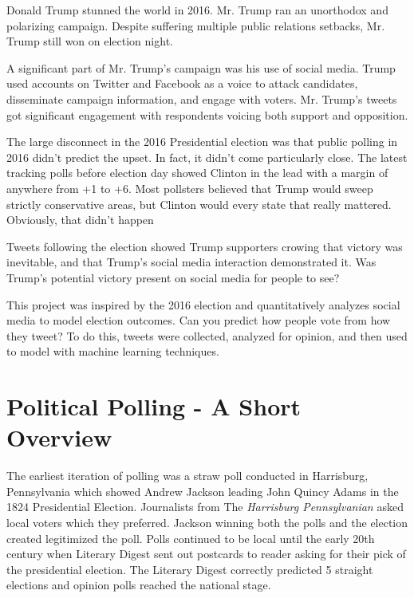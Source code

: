 \documentclass[11pt, twoside, reqno]{book}
\begin{document}
\startmain

\intro
\hspace{0.2in}Donald Trump stunned the world in 2016. Mr. Trump ran an unorthodox and polarizing campaign. Despite suffering multiple public relations setbacks, Mr. Trump still won on election night.

A significant part of Mr. Trump's campaign was his use of social media. Trump used accounts on Twitter and Facebook as a voice to attack candidates, disseminate campaign information, and engage with voters. Mr. Trump's tweets got significant engagement with respondents voicing both support and opposition. 

The large disconnect in the 2016 Presidential election was that public polling in 2016 didn’t predict the upset. In fact, it didn’t come particularly close. The latest tracking polls before election day showed Clinton in the lead with a margin of anywhere from +1 to +6\cite{gallup}. Most pollsters believed that Trump would sweep strictly conservative areas, but Clinton would every state that really mattered. Obviously, that didn’t happen

Tweets following the election showed Trump supporters crowing that victory was inevitable, and that Trump’s social media interaction demonstrated it. Was Trump’s potential victory present on social media for people to see? 

This project was inspired by the 2016 election and quantitatively analyzes social media to model election outcomes. Can you predict how people vote from how they tweet? To do this, tweets were collected, analyzed for opinion, and then used to model with machine learning techniques. 

\section{Political Polling - A Short Overview}
\hspace{0.2in} The earliest iteration of polling was a straw poll conducted in Harrisburg, Pennsylvania which showed Andrew Jackson leading John Quincy Adams in the 1824 Presidential Election. Journalists from The \textit{Harrisburg Pennsylvanian} asked local voters which they preferred. Jackson winning both the polls and the election created legitimized the poll. Polls continued to be local until the early 20th century when Literary Digest sent out postcards to reader asking for their pick of the presidential election. The Literary Digest correctly predicted 5 straight elections and opinion polls reached the national stage. 
\end{document}
